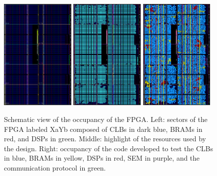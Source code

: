     \begin{figure}
      \centering
      \includegraphics[width=0.32\textwidth]{img/II-6-irradiation/fpga-empty.png}
      \includegraphics[width=0.32\textwidth]{img/II-6-irradiation/fpga-used.png}
      \includegraphics[width=0.32\textwidth]{img/II-6-irradiation/fpga-color.png}
      \caption{Schematic view of the occupancy of the FPGA. Left: sectors of the FPGA labeled XaYb composed of CLBs in dark blue, BRAMs in red, and DSPs in green. Middle: highlight of the resources used by the design. Right: occupancy of the code developed to test the CLBs in blue, BRAMs in yellow, DSPs in red, SEM in purple, and the communication protocol in green.}
      \label{fig:II-6-floorplanning}
    \end{figure}

